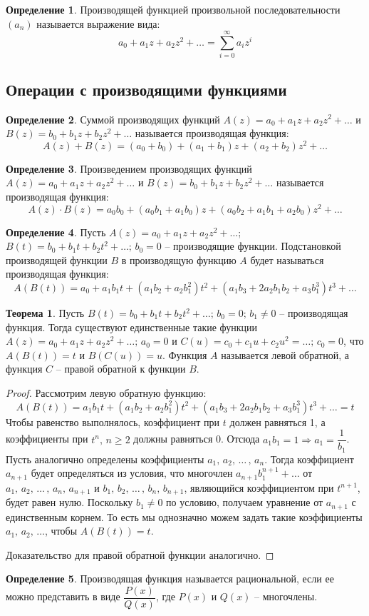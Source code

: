 \documentclass[12pt]{article}
\theoremstyle{definition}
\newtheorem{theorem}{Теорема}[section]
\newtheorem{definition}{Определение}
\begin{document}
\begin{definition}
    Производящей функцией произвольной последовательности $(a_n)$ называется выражение вида:
    $$a_0+a_1z+a_2z^2+\ldots=\sum_{i=0}^{\infty}a_iz^i$$
\end{definition}

\subsection{Операции с производящими функциями}

\begin{definition}
    Суммой производящих функций $A(z)=a_0+a_1z+a_2z^2+\ldots$ и $B(z)=b_0+b_1z+b_2z^2+\ldots$ называется производящая функция:
    $$A(z)+B(z)=(a_0+b_0)+(a_1+b_1)z+(a_2+b_2)z^2+\ldots$$
\end{definition}
\begin{definition}
    Произведением производящих функций $A(z)=a_0+a_1z+a_2z^2+\ldots$ и $B(z)=b_0+b_1z+b_2z^2+\ldots$ называется производящая функция:
    $$A(z)\cdot B(z)=a_0b_0+(a_0b_1+a_1b_0)z+(a_0b_2+a_1b_1+a_2b_0)z^2+\ldots$$
\end{definition}
\begin{definition}
    Пусть $A(z)=a_0+a_1z+a_2z^2+\ldots$; $B(t)=b_0+b_1t+b_2t^2+\ldots;\,b_0=0$ – производящие функции. Подстановкой производящей функции $B$ в производящую функцию $A$ будет называться производящая функция:
    $$A(B(t))=a_0+a_1b_1t+(a_1b_2+a_2b_1^2)t^2+(a_1b_3+2a_2b_1b_2+a_3b_1^3)t^3+\ldots$$
\end{definition}
\begin{theorem}
    Пусть $B(t)=b_0+b_1t+b_2t^2+\ldots;\,b_0=0;\,b_1\neq 0$ – производящая функция. Тогда существуют единственные такие функции $A(z)=a_0+a_1z+a_2z^2+\ldots;\,a_0=0$ и $C(u)=c_0+c_1u+c_2u^2=\ldots;\,c_0=0$, что $A(B(t))=t$ и $B(C(u))=u.$ Функция $A$ называется левой обратной, а функция $C$ – правой обратной к функции $B$.
\end{theorem}
\begin{proof}
    Рассмотрим левую обратную функцию:
    $$A(B(t))=a_1b_1t+(a_1b_2+a_2b_1^2)t^2+(a_1b_3+2a_2b_1b_2+a_3b_1^3)t^3+\ldots=t$$
    Чтобы равенство выполнялось, коэффициент при $t$ должен равняться 1, а коэффициенты при $t^n,\,n\geq 2$ должны равняться 0. Отсюда $a_1b_1=1\Longrightarrow a_1=\dfrac{1}{b_1}$. Пусть аналогично определены коэффициенты $a_1,\,a_2,\,\ldots\,,\,a_n$. Тогда коэффициент $a_{n+1}$ будет определяться из условия, что многочлен $a_{n+1}b^{n+1}_1+\ldots$ от $a_1,\,a_2,\,\ldots\,,\,a_n,\,a_{n+1}$ и $b_1,\,b_2,\,\ldots\,,\,b_n,\,b_{n+1}$, являющийся коэффициентом при $t^{n+1}$, будет равен нулю. Поскольку $b_1\neq 0$ по условию, получаем уравнение от $a_{n+1}$ с единственным корнем. То есть мы однозначно можем задать такие коэффициенты $a_1,\,a_2,\,\ldots$, чтобы $A(B(t))=t$.\bigskip
    
    Доказательство для правой обратной функции аналогично.
\end{proof}
\begin{definition}
    Производящая функция называется рациональной, если ее можно представить в виде $\dfrac{P(x)}{Q(x)}$, где $P(x)$ и $Q(x)$ – многочлены.
\end{definition}
\end{document}

